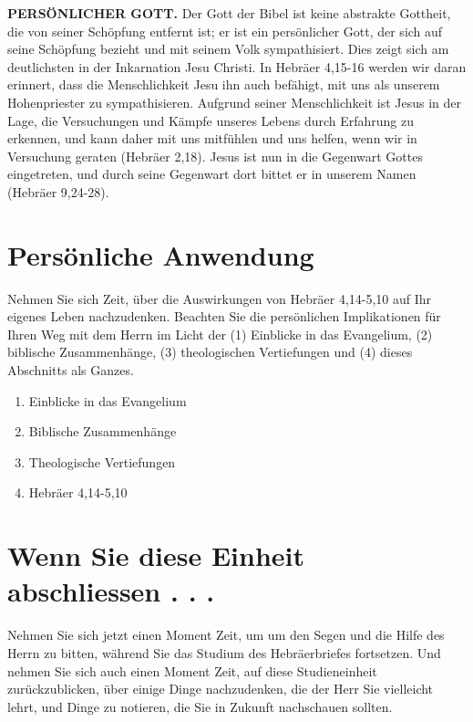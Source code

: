 \documentclass[headsepline=true]{book}
\providecommand{\tightlist}{%
  \setlength{\itemsep}{0pt}\setlength{\parskip}{0pt}}
\begin{document}
\textbf{PERSÖNLICHER GOTT.} Der Gott der Bibel ist keine abstrakte
Gottheit, die von seiner Schöpfung entfernt ist; er ist ein persönlicher
Gott, der sich auf seine Schöpfung bezieht und mit seinem Volk
sympathisiert. Dies zeigt sich am deutlichsten in der Inkarnation Jesu
Christi. In Hebräer 4,15-16 werden wir daran erinnert, dass die
Menschlichkeit Jesu ihn auch befähigt, mit uns als unserem Hohenpriester
zu sympathisieren. Aufgrund seiner Menschlichkeit ist Jesus in der Lage,
die Versuchungen und Kämpfe unseres Lebens durch Erfahrung zu erkennen,
und kann daher mit uns mitfühlen und uns helfen, wenn wir in Versuchung
geraten (Hebräer 2,18). Jesus ist nun in die Gegenwart Gottes
eingetreten, und durch seine Gegenwart dort bittet er in unserem Namen
(Hebräer 9,24-28).

\section{Persönliche Anwendung}\label{persuxf6nliche-anwendung-3}

Nehmen Sie sich Zeit, über die Auswirkungen von Hebräer 4,14-5,10 auf
Ihr eigenes Leben nachzudenken. Beachten Sie die persönlichen
Implikationen für Ihren Weg mit dem Herrn im Licht der (1) Einblicke in
das Evangelium, (2) biblische Zusammenhänge, (3) theologischen
Vertiefungen und (4) dieses Abschnitts als Ganzes.

\begin{enumerate}
\def\labelenumi{\arabic{enumi}.}
\tightlist
\item
  Einblicke in das Evangelium
\item
  Biblische Zusammenhänge
\item
  Theologische Vertiefungen
\item
  Hebräer 4,14-5,10
\end{enumerate}

\section{Wenn Sie diese Einheit abschliessen . .
.}\label{wenn-sie-diese-einheit-abschliessen-.-.-.-3}

Nehmen Sie sich jetzt einen Moment Zeit, um um den Segen und die Hilfe
des Herrn zu bitten, während Sie das Studium des Hebräerbriefes
fortsetzen. Und nehmen Sie sich auch einen Moment Zeit, auf diese
Studieneinheit zurückzublicken, über einige Dinge nachzudenken, die der
Herr Sie vielleicht lehrt, und Dinge zu notieren, die Sie in Zukunft
nachschauen sollten.
\end{document}
